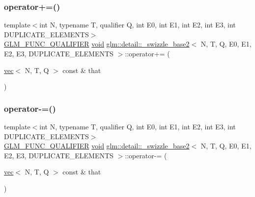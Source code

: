 \mbox{\label{structglm_1_1detail_1_1__swizzle__base2_a4c22bf1dde634b274789b630f75af0f1}} 
\subsubsection{\texorpdfstring{operator+=()}{operator+=()}}
{\footnotesize\ttfamily template$<$int N, typename T, qualifier Q, int E0, int E1, int E2, int E3, int D\+U\+P\+L\+I\+C\+A\+T\+E\+\_\+\+E\+L\+E\+M\+E\+N\+TS$>$ \\
\mbox{\hyperlink{setup_8hpp_a33fdea6f91c5f834105f7415e2a64407}{G\+L\+M\+\_\+\+F\+U\+N\+C\+\_\+\+Q\+U\+A\+L\+I\+F\+I\+ER}} \mbox{\hyperlink{_s_d_l__opengles2__gl2ext_8h_ae5d8fa23ad07c48bb609509eae494c95}{void}} \mbox{\hyperlink{structglm_1_1detail_1_1__swizzle__base2}{glm\+::detail\+::\+\_\+swizzle\+\_\+base2}}$<$ N, T, Q, E0, E1, E2, E3, D\+U\+P\+L\+I\+C\+A\+T\+E\+\_\+\+E\+L\+E\+M\+E\+N\+TS $>$\+::operator+= (\begin{DoxyParamCaption}\item[{\mbox{\hyperlink{structglm_1_1vec}{vec}}$<$ N, T, Q $>$ const \&}]{that }\end{DoxyParamCaption})\hspace{0.3cm}{\ttfamily [inline]}}

\mbox{\label{structglm_1_1detail_1_1__swizzle__base2_a5e985ec8cbfa38395aa667eea74d2ca0}} 
\subsubsection{\texorpdfstring{operator-\/=()}{operator-=()}}
{\footnotesize\ttfamily template$<$int N, typename T, qualifier Q, int E0, int E1, int E2, int E3, int D\+U\+P\+L\+I\+C\+A\+T\+E\+\_\+\+E\+L\+E\+M\+E\+N\+TS$>$ \\
\mbox{\hyperlink{setup_8hpp_a33fdea6f91c5f834105f7415e2a64407}{G\+L\+M\+\_\+\+F\+U\+N\+C\+\_\+\+Q\+U\+A\+L\+I\+F\+I\+ER}} \mbox{\hyperlink{_s_d_l__opengles2__gl2ext_8h_ae5d8fa23ad07c48bb609509eae494c95}{void}} \mbox{\hyperlink{structglm_1_1detail_1_1__swizzle__base2}{glm\+::detail\+::\+\_\+swizzle\+\_\+base2}}$<$ N, T, Q, E0, E1, E2, E3, D\+U\+P\+L\+I\+C\+A\+T\+E\+\_\+\+E\+L\+E\+M\+E\+N\+TS $>$\+::operator-\/= (\begin{DoxyParamCaption}\item[{\mbox{\hyperlink{structglm_1_1vec}{vec}}$<$ N, T, Q $>$ const \&}]{that }\end{DoxyParamCaption})\hspace{0.3cm}{\ttfamily [inline]}}

